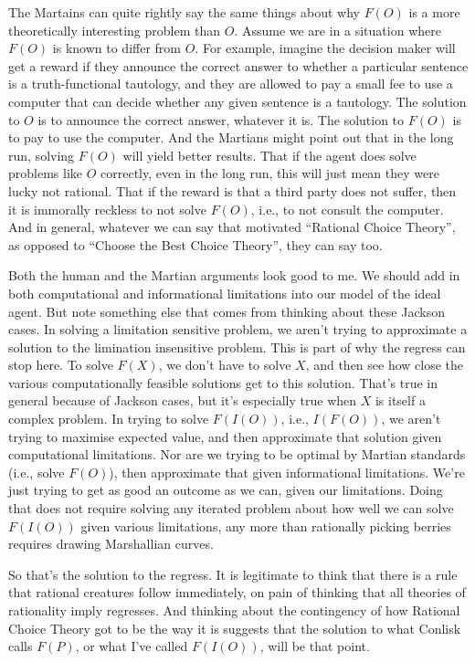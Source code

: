\documentclass[
  12pt,
]{article}
\begin{document}
The Martains can quite rightly say the same things about why \(F(O)\) is a more theoretically interesting problem than \(O\). Assume we are in a situation where \(F(O)\) is known to differ from \(O\). For example, imagine the decision maker will get a reward if they announce the correct answer to whether a particular sentence is a truth-functional tautology, and they are allowed to pay a small fee to use a computer that can decide whether any given sentence is a tautology. The solution to \(O\) is to announce the correct answer, whatever it is. The solution to \(F(O)\) is to pay to use the computer. And the Martians might point out that in the long run, solving \(F(O)\) will yield better results. That if the agent does solve problems like \(O\) correctly, even in the long run, this will just mean they were lucky not rational. That if the reward is that a third party does not suffer, then it is immorally reckless to not solve \(F(O)\), i.e., to not consult the computer. And in general, whatever we can say that motivated ``Rational Choice Theory'', as opposed to ``Choose the Best Choice Theory'', they can say too.

Both the human and the Martian arguments look good to me. We should add in both computational and informational limitations into our model of the ideal agent. But note something else that comes from thinking about these Jackson cases. In solving a limitation sensitive problem, we aren't trying to approximate a solution to the limination insensitive problem. This is part of why the regress can stop here. To solve \(F(X)\), we don't have to solve \(X\), and then see how close the various computationally feasible solutions get to this solution. That's true in general because of Jackson cases, but it's especially true when \(X\) is itself a complex problem. In trying to solve \(F(I(O))\), i.e., \(I(F(O))\), we aren't trying to maximise expected value, and then approximate that solution given computational limitations. Nor are we trying to be optimal by Martian standards (i.e., solve \(F(O)\)), then approximate that given informational limitations. We're just trying to get as good an outcome as we can, given our limitations. Doing that does not require solving any iterated problem about how well we can solve \(F(I(O))\) given various limitations, any more than rationally picking berries requires drawing Marshallian curves.

So that's the solution to the regress. It is legitimate to think that there is a rule that rational creatures follow immediately, on pain of thinking that all theories of rationality imply regresses. And thinking about the contingency of how Rational Choice Theory got to be the way it is suggests that the solution to what Conlisk calls \(F(P)\), or what I've called \(F(I(O))\), will be that point.
\end{document}
